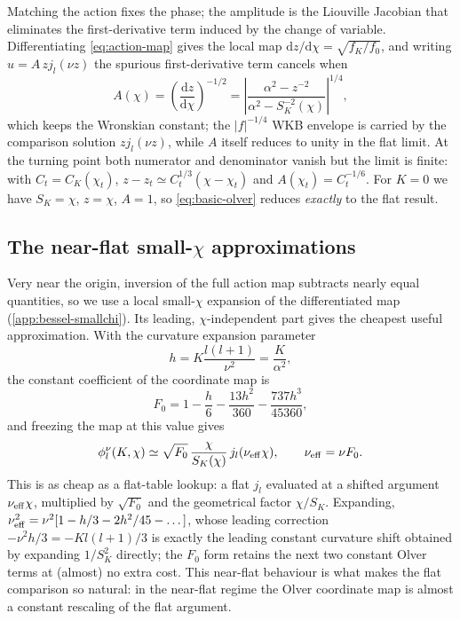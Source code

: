 \documentclass[prd, twocolumn, superscriptaddress, tightenlines, longbibliography, nofootinbib, eqsecnum, amsfonts, amsmath, floatfix, notitlepage]{revtex4-2}
\newcommand{\dd}{\mathrm{d}}
\newcommand{\SK}{S_K}
\newcommand{\CK}{C_K}
\newcommand{\jl}{j_l}
\begin{document}
Matching the action fixes the phase; the amplitude is the Liouville Jacobian that
eliminates the first-derivative term induced by the change of variable. Differentiating \cref{eq:action-map} gives the local map
$\dd z/\dd\chi=\sqrt{f_K/f_0}$, and writing $u=A\,z\jl(\nu z)$ the spurious
first-derivative term cancels when
\begin{equation}
  A(\chi)=\left(\frac{\dd z}{\dd\chi}\right)^{-1/2}
  =\left|\frac{\alpha^2-z^{-2}}{\alpha^2-\SK^{-2}(\chi)}\right|^{1/4},
  \label{eq:amplitude}
\end{equation}
which keeps the Wronskian constant; the $|f|^{-1/4}$ WKB envelope is carried by the
comparison solution $z\jl(\nu z)$, while $A$ itself reduces to unity in the flat
limit. At the turning point both numerator and denominator vanish but the limit is
finite: with $C_t=\CK(\chi_t)$, $z-z_t\simeq C_t^{1/3}(\chi-\chi_t)$ and
$A(\chi_t)=C_t^{-1/6}$. For $K=0$ we have $\SK=\chi$, $z=\chi$, $A=1$, so
\cref{eq:basic-olver} reduces \emph{exactly} to the flat result.

\subsection{The near-flat small-$\chi$ approximations}
\label{sec:bessel-shifted}

Very near the origin, inversion of the full action map subtracts nearly equal quantities, so we
use a local small-$\chi$ expansion of the differentiated map (\cref{app:bessel-smallchi}).
Its leading, $\chi$-independent part gives the cheapest useful approximation.
With the curvature expansion parameter
\begin{equation}
  h=K\frac{l(l+1)}{\nu^2}=\frac{K}{\alpha^2},
\end{equation}
the constant coefficient of the coordinate map is
\begin{equation}
  F_0=1-\frac{h}{6}-\frac{13h^2}{360}-\frac{737h^3}{45360},
  \label{eq:F0}
\end{equation}
and freezing the map at this value gives
\begin{equation}
  \phi_l^\nu(K,\chi)\simeq \sqrt{F_0}\,\frac{\chi}{\SK(\chi)}\,\jl(\nu_{\rm eff}\chi),
  \qquad \nu_{\rm eff}=\nu F_0 .
  \label{eq:shifted-nu}
\end{equation}
This is as cheap as a flat-table lookup: a flat $\jl$ evaluated at a shifted
argument $\nu_{\rm eff}\chi$, multiplied by $\sqrt{F_0}$ and the geometrical factor
$\chi/\SK$. Expanding, $\nu_{\rm eff}^2=\nu^2[1-h/3-2h^2/45-\dots]$, whose leading
correction $-\nu^2 h/3=-Kl(l+1)/3$ is exactly the leading constant curvature shift
obtained by expanding $1/\SK^2$ directly; the $F_0$ form retains the next two
constant Olver terms at (almost) no extra cost. This near-flat behaviour is what makes the
flat comparison so natural: in the near-flat regime the Olver coordinate map is
almost a constant rescaling of the flat argument.
\end{document}
